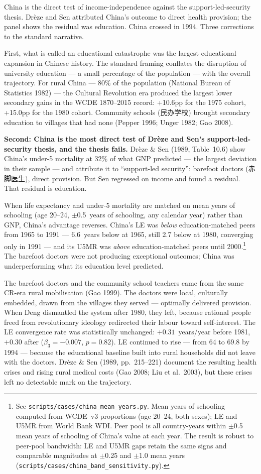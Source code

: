 \documentclass[12pt,letterpaper]{article}
\begin{document}
China is the direct test of income-independence against the
support-led-security thesis. Drèze and Sen attributed China's outcome
to direct health provision; the panel shows the residual was
education. China crossed in 1994. Three corrections to the standard
narrative.

First, what is called an educational catastrophe was
the largest educational expansion in Chinese history. The standard
framing conflates the disruption of university education --- a
small percentage of the population --- with the overall
trajectory. For rural China --- 80\% of the population
(National Bureau of Statistics 1982) --- the Cultural Revolution era
produced the largest lower secondary gains in the WCDE
1870--2015 record: +10.6pp for the 1975 cohort, +15.0pp for the 1980
cohort. Community schools (民办学校) brought secondary
education to villages that had none (Pepper 1996; Unger 1982; Gao 2008).

\textbf{Second: China is the most direct test of Drèze and Sen's
support-led-security thesis, and the thesis fails.} Drèze \& Sen
(1989, Table~10.6) show China's under-5 mortality at 32\% of what GNP
predicted --- the largest deviation in their sample --- and attribute it
to ``support-led security'': barefoot doctors (赤脚医生), direct
provision. But Sen regressed on income and found a residual. That
residual is education.

When life expectancy and under-5 mortality are matched on mean years of
schooling (age 20--24, $\pm$0.5~years of schooling, any calendar year)
rather than GNP, China's advantage reverses. China's LE was
\emph{below} education-matched peers from 1965 to 1991 --- 6.6~years
below at 1965, still 2.7 below at 1980, converging only in 1991 --- and
its U5MR was \emph{above} education-matched peers until 2000.\footnote{See
\texttt{scripts/cases/china\_mean\_years.py}. Mean years of schooling
computed from WCDE~v3 proportions (age 20--24, both sexes); LE and U5MR
from World Bank WDI. Peer pool is all country-years within $\pm$0.5
mean years of schooling of China's value at each year. The result is robust to peer-pool bandwidth: LE and U5MR gaps retain the same signs and comparable magnitudes at $\pm$0.25 and $\pm$1.0 mean years (\texttt{scripts/cases/china\_band\_sensitivity.py}).} The barefoot
doctors were not producing exceptional outcomes; China was
underperforming what its education level predicted.

The barefoot doctors and the community school teachers came from the same
CR-era rural mobilisation (Gao 1999). The doctors were local, culturally embedded,
drawn from the villages they served --- optimally delivered provision.
When Deng dismantled the system after 1980, they left, because rational
people freed from revolutionary ideology redirected their labour toward
self-interest. The LE convergence rate was statistically unchanged:
$+0.31$~years/year before 1981, $+0.30$ after ($\beta_3 = -0.007$, $p =
0.82$). LE continued to rise --- from 64 to 69.8 by 1994 --- because
the educational baseline built into rural households did not leave with
the doctors. Drèze \& Sen (1989, pp.~215--221) document the resulting
health crises and rising rural medical costs (Gao 2008; Liu et
al.~2003), but these crises left no detectable mark on the trajectory.
\end{document}
